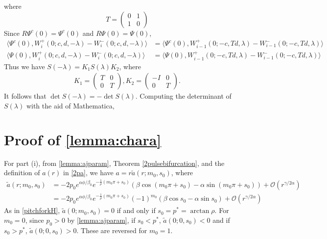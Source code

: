 \documentclass[thesis.tex]{subfiles}
\begin{document}
where 
\[
T = \begin{pmatrix} 0 & 1 \\ 1 & 0 \end{pmatrix}
\]
Since $R \Psi^c(0) = \Psi^c(0)$ and $R \Psi(0) = \Psi(0)$,
\begin{align*}
\langle \Psi^c(0), W_i^+(0; c, d, -\lambda) - W_i^-(0; c, d, -\lambda) \rangle &= \langle \Psi^c(0), W_{i-1}^+(0; -c, T d, \lambda) - W_{i-1}^-(0; -c, T d, \lambda) \rangle \\
\langle \Psi(0), W_i^+(0; c, d, -\lambda) - W_i^-(0; c, d, -\lambda) \rangle &= \langle \Psi(0), W_{i-1}^+(0; -c, T d, \lambda) - W_{i-1}^-(0; -c, T d, \lambda) \rangle 
\end{align*}
Thus we have $S(-\lambda) = K_1 S(\lambda) K_2$, where
\begin{align*}
K_1 = \begin{pmatrix}T & 0 \\ 0 & T \end{pmatrix}, 
K_2 = \begin{pmatrix}-I & 0 \\ 0 & T \end{pmatrix}.
\end{align*}
It follows that $\det S(-\lambda) = -\det S(\lambda)$. Computing the determinant of $S(\lambda)$ with the aid of Mathematica,


\section{Proof of \cref{lemma:chara} }

For part (i), from \cref{lemma:ajparam}, Theorem \cref{2pulsebifurcation}, and the definition of $a(r)$ in \cref{2pa}, we have $a = r \tilde{a}(r; m_0, s_0)$, where
\begin{align*}
\tilde{a}(r; m_0, s_0) &= -2 p_0 e^{\alpha \phi/\beta_0} e^{-\frac{1}{\rho}(m_0 \pi + s_0)} \left( \beta \cos\left(m_0 \pi + s_0 \right) - \alpha \sin \left(m_0 \pi + s_0 \right) \right) + \mathcal{O}(r^{\gamma/2\alpha}) \\
&= -2 p_0 e^{\alpha \phi/\beta_0} e^{-\frac{1}{\rho}(m_0 \pi + s_0)} (-1)^{m_0} \left( \beta \cos s_0 - \alpha \sin s_0 \right) + \mathcal{O}(r^{\gamma/2\alpha})
\end{align*}
As in \cref{pitchforkH}, $\tilde{a}(0; m_0, s_0) = 0$ if and only if $s_0 = p^* = \arctan \rho$. For $m_0 = 0$, since $p_0 > 0$ by \cref{lemma:ajparam}, if $s_0 < p^*$, $\tilde{a}(0; 0, s_0) < 0$ and if $s_0 > p^*$, $\tilde{a}(0; 0, s_0) > 0$. These are reversed for $m_0 = 1$.
\end{document}
